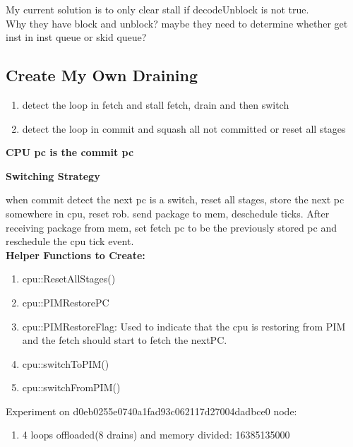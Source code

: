 \documentclass[11pt]{article}
\begin{document}
My current solution is to only clear stall if decodeUnblock is not true.\\

Why they have block and unblock? maybe they need to determine whether get inst in inst queue or skid queue?

\subsection{Create My Own Draining}
\begin{enumerate}
	\item detect the loop in fetch and stall fetch, drain and then switch
	
	\item detect the loop in commit and squash all not committed or reset all stages
\end{enumerate}

\textbf{CPU pc is the commit pc\\}

\textbf{Switching Strategy\\}

when commit detect the next pc is a switch, reset all stages, store the next pc somewhere in cpu, reset rob. send package to mem, deschedule ticks. After receiving package from mem, set fetch pc to be the previously stored pc and reschedule the cpu tick event.\\

\textbf{Helper Functions to Create:\\}

\begin{enumerate}
	\item cpu::ResetAllStages()
	
	\item cpu::PIMRestorePC
	
	\item cpu::PIMRestoreFlag: Used to indicate that the cpu is restoring from PIM and the fetch should start to fetch the nextPC.
	
	\item cpu::switchToPIM()
	
	\item cpu::switchFromPIM()
\end{enumerate}

Experiment on d0eb0255e0740a1fad93c062117d27004dadbce0 node:

\begin{enumerate}
	\item 4 loops offloaded(8 drains) and memory divided: 16385135000
\end{enumerate}
\end{document}
